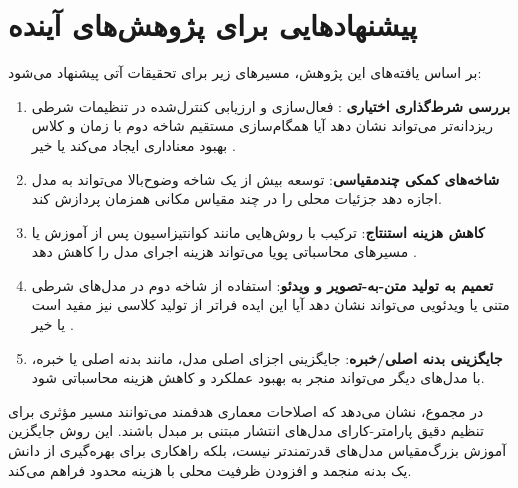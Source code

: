 \section{پیشنهادهایی برای پژوهش‌های آینده}
بر اساس یافته‌های این پژوهش، مسیرهای زیر برای تحقیقات آتی پیشنهاد می‌شود:
\begin{enumerate}
    \item \textbf{بررسی شرط‌گذاری اختیاری }: فعال‌سازی و ارزیابی کنترل‌شده  در تنظیمات شرطی ریزدانه‌تر می‌تواند نشان دهد آیا همگام‌سازی مستقیم شاخه دوم با زمان و کلاس بهبود معناداری ایجاد می‌کند یا خیر \cite{perez2018film}.
    \item \textbf{شاخه‌های کمکی چندمقیاسی}: توسعه بیش از یک شاخه وضوح‌بالا می‌تواند به مدل اجازه دهد جزئیات محلی را در چند مقیاس مکانی همزمان پردازش کند.
    \item \textbf{کاهش هزینه استنتاج}: ترکیب  با روش‌هایی مانند کوانتیزاسیون پس از آموزش یا مسیرهای محاسباتی پویا می‌تواند هزینه اجرای مدل را کاهش دهد \cite{2406.17343}.
    \item \textbf{تعمیم به تولید متن-به-تصویر و ویدئو}: استفاده از شاخه دوم در مدل‌های شرطی متنی یا ویدئویی می‌تواند نشان دهد آیا این ایده فراتر از تولید کلاسی  نیز مفید است یا خیر \cite{9851474,8313484}.
    \item \textbf{جایگزینی بدنه اصلی/خبره}: جایگزینی اجزای اصلی مدل، مانند بدنه اصلی یا خبره، با مدل‌های دیگر می‌تواند منجر به بهبود عملکرد و کاهش هزینه محاسباتی شود.
\end{enumerate}

در مجموع،  نشان می‌دهد که اصلاحات معماری هدفمند می‌توانند مسیر مؤثری برای تنظیم دقیق پارامتر-کارای مدل‌های انتشار مبتنی بر مبدل باشند. این روش جایگزین آموزش بزرگ‌مقیاس مدل‌های قدرتمندتر نیست، بلکه راهکاری برای بهره‌گیری از دانش یک بدنه منجمد و افزودن ظرفیت محلی با هزینه محدود فراهم می‌کند.
